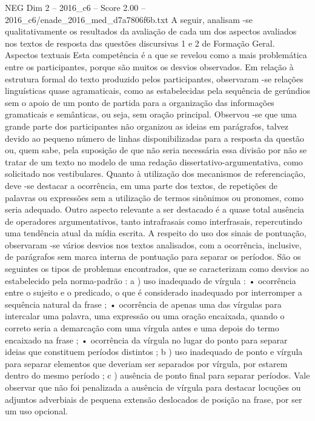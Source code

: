 \begin{textsample}{NEG Dim 2 – 2016\_c6 – Score 2.00 – 2016\_c6/enade\_2016\_med\_d7a7806f6b.txt}
A seguir, analisam -se qualitativamente os resultados da avaliação de cada um dos aspectos avaliados nos textos de resposta das questões discursivas 1 e 2 de Formação Geral.
Aspectos textuais Esta competência é a que se revelou como a mais problemática entre os participantes, porque são muitos os desvios observados.
Em relação à estrutura formal do texto produzido pelos participantes, observaram -se relações linguísticas quase agramaticais, como as estabelecidas pela sequência de gerúndios sem o apoio de um ponto de partida para a organização das informações gramaticais e semânticas, ou seja, sem oração principal.
Observou -se que uma grande parte dos participantes não organizou as ideias em parágrafos, talvez devido ao pequeno número de linhas disponibilizadas para a resposta da questão ou, quem sabe, pela suposição de que não seria necessária essa divisão por não se tratar de um texto no modelo de uma redação dissertativo-argumentativa, como solicitado nos vestibulares.
Quanto à utilização dos mecanismos de referenciação, deve -se destacar a ocorrência, em uma parte dos textos, de repetições de palavras ou expressões sem a utilização de termos sinônimos ou pronomes, como seria adequado.
Outro aspecto relevante a ser destacado é a quase total ausência de operadores argumentativos, tanto intrafrasais como interfrasais, repercutindo uma tendência atual da mídia escrita.
A respeito do uso dos sinais de pontuação, observaram -se vários desvios nos textos analisados, com a ocorrência, inclusive, de parágrafos sem marca interna de pontuação para separar os períodos.
São os seguintes os tipos de problemas encontrados, que se caracterizam como desvios ao estabelecido pela norma-padrão : a ) uso inadequado de vírgula : • ocorrência entre o sujeito e o predicado, o que é considerado inadequado por interromper a sequência natural da frase ; • ocorrência de apenas uma das vírgulas para intercalar uma palavra, uma expressão ou uma oração encaixada, quando o correto seria a demarcação com uma vírgula antes e uma depois do termo encaixado na frase ; • ocorrência da vírgula no lugar do ponto para separar ideias que constituem períodos distintos ; b ) uso inadequado de ponto e vírgula para separar elementos que deveriam ser separados por vírgula, por estarem dentro do mesmo período ; c ) ausência de ponto final para separar períodos.
Vale observar que não foi penalizada a ausência de vírgula para destacar locuções ou adjuntos adverbiais de pequena extensão deslocados de posição na frase, por ser um uso opcional.

\end{textsample}
